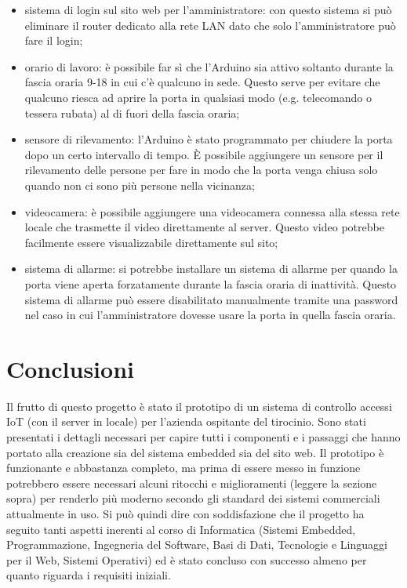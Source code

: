 \documentclass[12pt]{report}
\begin{document}
\begin{itemize}
	\item sistema di login sul sito web per l'amministratore: con questo sistema si può eliminare il router dedicato alla rete LAN dato che solo l'amministratore può fare il login; 
	\item orario di lavoro: è possibile far sì che l'Arduino sia attivo soltanto durante la fascia oraria 9-18 in cui c'è qualcuno in sede. Questo serve per evitare che qualcuno riesca ad aprire la porta in qualsiasi modo (e.g. telecomando o tessera rubata) al di fuori della fascia oraria;
	\item sensore di rilevamento: l'Arduino è stato programmato per chiudere la porta dopo un certo intervallo di tempo. È possibile aggiungere un sensore per il rilevamento delle persone per fare in modo che la porta venga chiusa solo quando non ci sono più persone nella vicinanza;
	\item videocamera: è possibile aggiungere una videocamera connessa alla stessa rete locale che trasmette il video direttamente al server. Questo video potrebbe facilmente essere visualizzabile direttamente sul sito;
	\item sistema di allarme: si potrebbe installare un sistema di allarme per quando la porta viene aperta forzatamente durante la fascia oraria di inattività. Questo sistema di allarme può essere disabilitato manualmente tramite una password nel caso in cui l'amministratore dovesse usare la porta in quella fascia oraria.
\end{itemize}

%
\section{Conclusioni}
%

Il frutto di questo progetto è stato il prototipo di un sistema di controllo accessi IoT (con il server in locale) per l'azienda ospitante del tirocinio. Sono stati presentati i dettagli necessari per capire tutti i componenti e i passaggi che hanno portato alla creazione sia del sistema embedded sia del sito web.
Il prototipo è funzionante e abbastanza completo, ma prima di essere messo in funzione potrebbero essere necessari alcuni ritocchi e miglioramenti (leggere la sezione sopra) per renderlo più moderno secondo gli standard dei sistemi commerciali attualmente in uso. Si può quindi dire con soddisfazione che il progetto ha seguito tanti aspetti inerenti al corso di Informatica (Sistemi Embedded, Programmazione, Ingegneria del Software, Basi di Dati, Tecnologie e Linguaggi per il Web, Sistemi Operativi) ed è stato concluso con successo almeno per quanto riguarda i requisiti iniziali.
\end{document}
